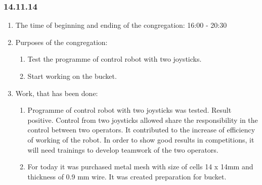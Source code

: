 
\subsubsection{14.11.14}

\begin{enumerate} 
	\item The time of beginning and ending of the congregation:
	16:00 - 20:30
	\item Purposes of the congregation:
	\begin{enumerate}
		\item Test the programme of control robot with two joysticks.
		
		\item Start working on the bucket.
		
	\end{enumerate}
	
	\item Work, that has been done:
	\begin{enumerate}
		\item Programme of control robot with two joysticks was tested. Result positive. Control from two joysticks allowed share the responsibility in the control between two operators. It contributed to the increase of  efficiency of working of the robot. In order to show good results in competitions, it will need trainings to develop teamwork of the two operators.
		
		\item For today it was purchased metal mesh with size of cells 14 x 14mm and thickness of 0.9 mm wire. It was created preparation for bucket.
		

\end{enumerate}
\end{enumerate}
